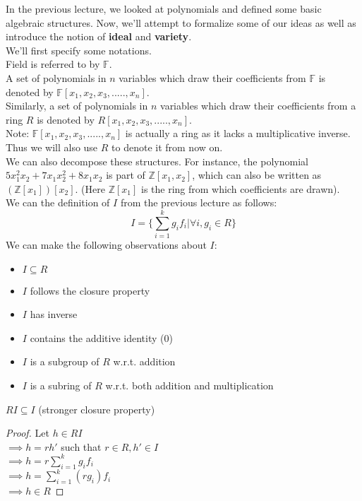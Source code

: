 
In the previous lecture, we looked at polynomials and defined some basic algebraic structures. Now, we'll attempt to formalize some of our ideas as well as introduce the notion of \textbf{ideal} and \textbf{variety}.\\

We'll first specify some notations.\\
Field is referred to by $\mathbb{F}$.\\
A set of polynomials in $n$ variables which draw their coefficients from $\mathbb{F}$ is denoted by $\mathbb{F}[x_1,x_2,x_3,.....,x_n]$.\\
Similarly, a set of polynomials in $n$ variables which draw their coefficients from a ring $R$ is denoted by $R[x_1,x_2,x_3,.....,x_n]$.\\
Note: $\mathbb{F}[x_1,x_2,x_3,.....,x_n]$ is actually a ring as it lacks a multiplicative inverse. Thus we will also use $R$ to denote it from now on.\\

We can also decompose these structures. For instance, the polynomial $5x_1^2x_2 + 7x_1x_2^2 + 8x_1x_2$ is part of $\mathbb{Z}[x_1,x_2]$, which can also be written as $(\mathbb{Z}[x_1])[x_2]$. (Here $\mathbb{Z}[x_1]$ is the ring from which coefficients are drawn).\\

We can the definition of $I$ from the previous lecture as follows:
\begin{equation}
I = \{\sum\limits_{i=1}^{k} g_{i}f_{i}| \forall i, g_i \in R\}
\end{equation}
We can make the following observations about $I$:
\begin{itemize}
\item $I \subseteq R$
\item $I$ follows the closure property
\item $I$ has inverse
\item $I$ contains the additive identity (0)
\item $I$ is a subgroup of $R$ w.r.t. addition
\item $I$ is a subring of $R$ w.r.t. both addition and multiplication\\
\end{itemize}

\begin{observation}
$RI \subseteq I$ (stronger closure property)
\end{observation}
\begin{proof}
Let $h \in RI$\\
$\implies h=rh'$ such that $r \in R, h' \in I$\\
$\implies h=r\sum\limits_{i=1}^{k} g_{i}f_{i}$\\
$\implies h=\sum\limits_{i=1}^{k} (rg_{i})f_{i}$\\
$\implies h \in R$
\end{proof}

